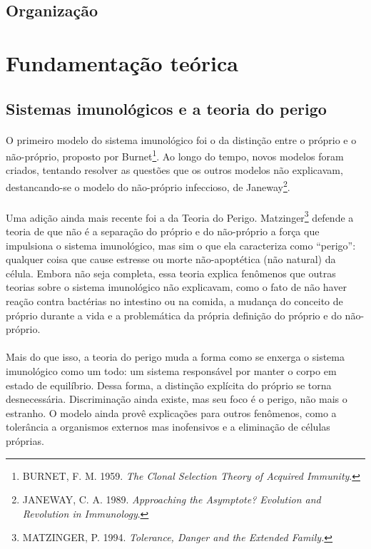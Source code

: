 \documentclass{article}
\begin{document}
\subsection{Organização}
\newpage

\section{Fundamentação teórica}

\subsection{Sistemas imunológicos e a teoria do perigo}

\paragraph{}O primeiro modelo do sistema imunológico foi o da distinção entre o próprio e o não-próprio, proposto por Burnet\footnote{BURNET, F. M. 1959. \emph{The Clonal Selection Theory of Acquired Immunity}.}. Ao longo do tempo, novos modelos foram criados, tentando resolver as questões que os outros modelos não explicavam, destancando-se o modelo do não-próprio infeccioso, de Janeway\footnote{JANEWAY, C. A. 1989. \emph{Approaching the Asymptote? Evolution and Revolution in Immunology}.}.

\paragraph{}Uma adição ainda mais recente foi a da Teoria do Perigo. Matzinger\footnote{MATZINGER, P. 1994. \emph{Tolerance, Danger and the Extended Family.}} defende a teoria de que não é a separação do próprio e do não-próprio a força que impulsiona o sistema imunológico, mas sim o que ela caracteriza como ``perigo'': qualquer coisa que cause estresse ou morte não-apoptética (não natural) da célula. Embora não seja completa, essa teoria explica fenômenos que outras teorias sobre o sistema imunológico não explicavam, como o fato de não haver reação contra bactérias no intestino ou na comida, a mudança do conceito de próprio durante a vida e a problemática da própria definição do próprio e do não-próprio.

\paragraph{}Mais do que isso, a teoria do perigo muda a forma como se enxerga o sistema imunológico como um todo: um sistema responsável por manter o corpo em estado de equilíbrio. Dessa forma, a distinção explícita do próprio se torna desnecessária. Discriminação ainda existe, mas seu foco é o perigo, não mais o estranho. O modelo ainda provê explicações para outros fenômenos, como a tolerância a organismos externos mas inofensivos e a eliminação de células próprias.
\end{document}
